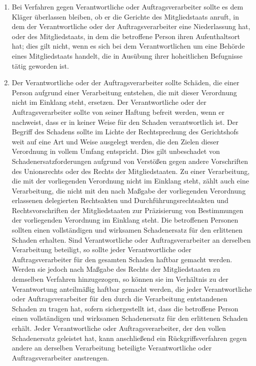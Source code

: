 \begin{enumerate}

   \item Bei Verfahren gegen Verantwortliche oder Auftragsverarbeiter sollte es dem Kläger überlassen bleiben, ob er die
    Gerichte des Mitgliedstaats anruft, in dem der Verantwortliche oder der Auftragsverarbeiter eine Niederlassung hat,
    oder des Mitgliedstaats, in dem die betroffene Person ihren Aufenthaltsort hat; dies gilt nicht, wenn es sich bei
    dem Verantwortlichen um eine Behörde eines Mitgliedstaats handelt, die in Ausübung ihrer hoheitlichen Befugnisse
    tätig geworden ist.%
   \label{eg:145}
   

   \item Der Verantwortliche oder der Auftragsverarbeiter sollte Schäden, die einer Person aufgrund einer Verarbeitung
    entstehen, die mit dieser Verordnung nicht im Einklang steht, ersetzen. Der Verantwortliche oder der
    Auftragsverarbeiter sollte von seiner Haftung befreit werden, wenn er nachweist, dass er in keiner Weise für den
    Schaden verantwortlich ist. Der Begriff des Schadens sollte im Lichte der Rechtsprechung des Gerichtshofs weit auf
    eine Art und Weise ausgelegt werden, die den Zielen dieser Verordnung in vollem Umfang entspricht. Dies gilt
    unbeschadet von Schadenersatzforderungen aufgrund von Verstößen gegen andere Vorschriften des Unionsrechts oder des
    Rechts der Mitgliedstaaten. Zu einer Verarbeitung, die mit der vorliegenden Verordnung nicht im Einklang steht,
    zählt auch eine Verarbeitung, die nicht mit den nach Maßgabe der vorliegenden Verordnung erlassenen delegierten
    Rechtsakten und Durchführungsrechtsakten und Rechtsvorschriften der Mitgliedstaaten zur Präzisierung von
    Bestimmungen der vorliegenden Verordnung im Einklang steht. Die betroffenen Personen sollten einen vollständigen
    und wirksamen Schadenersatz für den erlittenen Schaden erhalten. Sind Verantwortliche oder Auftragsverarbeiter an
    derselben Verarbeitung beteiligt, so sollte jeder Verantwortliche oder Auftragsverarbeiter für den gesamten Schaden
    haftbar gemacht werden. Werden sie jedoch nach Maßgabe des Rechts der Mitgliedstaaten zu demselben Verfahren
    hinzugezogen, so können sie im Verhältnis zu der Verantwortung anteilmäßig haftbar gemacht werden, die jeder
    Verantwortliche oder Auftragsverarbeiter für den durch die Verarbeitung entstandenen Schaden zu tragen hat, sofern
    sichergestellt ist, dass die betroffene Person einen vollständigen und wirksamen Schadenersatz für den erlittenen
    Schaden erhält. Jeder Verantwortliche oder Auftragsverarbeiter, der den vollen Schadenersatz geleistet hat, kann
    anschließend ein Rückgriffsverfahren gegen andere an derselben Verarbeitung beteiligte Verantwortliche oder
    Auftragsverarbeiter anstrengen.%
   \label{eg:146}
   

\end{enumerate}

